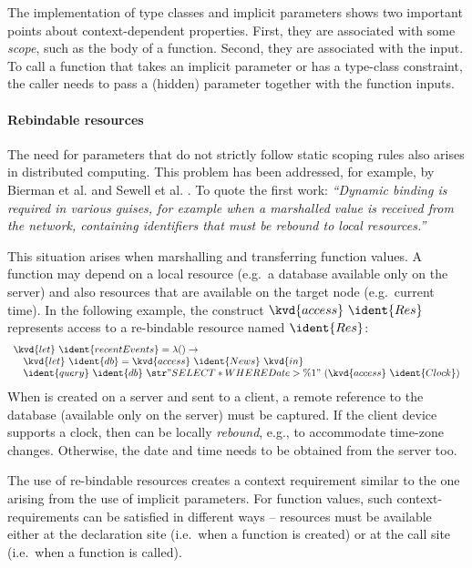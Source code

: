The implementation of type classes and implicit parameters shows two important points about 
context-dependent properties. First, they are associated with some \emph{scope}, such as the body
of a function. Second, they are associated with the input. To call a function that takes an 
implicit parameter or has a type-class constraint, the caller needs to pass a (hidden) parameter
together with the function inputs.


\paragraph{Rebindable resources}
The need for parameters that do not strictly follow static scoping rules also arises in distributed
computing. This problem has been addressed, for example, by Bierman et al. and Sewell et al. 
\cite{app-distributed-rebinding,app-distributed-acute}. To quote the first work: \emph{``Dynamic 
binding is required in various guises, for example when a marshalled value is received from the 
network, containing identifiers that must be rebound to local resources.''}

This situation arises when marshalling and transferring function values. A function may depend 
on a local resource (e.g.~a database available only on the server) and also resources that are 
available on the target node (e.g.~current time). In the following example, the construct
$\kvd{access}~\ident{Res}$ represents access to a re-bindable resource named $\ident{Res}$:
%
\begin{equation*}
\begin{array}{l}
\kvd{let}~\ident{recentEvents} = \lambda () \rightarrow\\
\quad\kvd{let}~\ident{db} = \kvd{access}~\ident{News}~\kvd{in}\\
\quad\ident{query}~\ident{db}~\str{"SELECT * WHERE Date > \%1"}~(\kvd{access}~\ident{Clock})
\end{array}
\end{equation*}
%
When  is created on a server and sent to a client, a remote reference to the 
database (available only on the server) must be captured. If the client device supports a clock, 
then  can be locally \emph{rebound}, e.g., to accommodate time-zone changes. 
Otherwise, the date and time needs to be obtained from the server too.

The use of re-bindable resources creates a context requirement similar to the one arising from
the use of implicit parameters. For function values, such context-requirements can be satisfied
in different ways -- resources must be available either at the declaration site (i.e.~when a 
function is created) or at the call site (i.e.~when a function is called).

